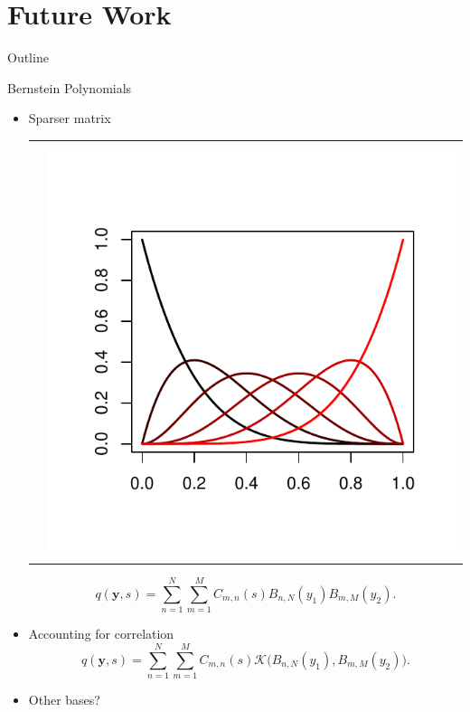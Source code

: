 \documentclass{beamer}
\newcommand{\by} {\mathbf{y}}
\begin{document}
\section{Future Work}

\begin{frame}{Outline}
  \tableofcontents[currentsection]
\end{frame}




\begin{frame}{Bernstein Polynomials}
\begin{itemize}
	\item Sparser matrix
	\vspace{-10mm}
	\begin{centering}
	\begin{tabular}{cc}
		\begin{minipage}{0.5\textwidth}
		\[ B_{\nu,n}(x) = \left( \begin{array}{c} n \\ \nu \end{array} \right) x^\nu (1-x)^{n-\nu},\]
		\[\nu = 0, \ldots, n \]
		\end{minipage}
		&
		\begin{minipage}{0.5\textwidth}
			\includegraphics[scale=.5]{./section-4-figures/bernstein.pdf}
		\end{minipage}
	\end{tabular}
	\end{centering}
	\vspace{-10mm}
	\[ q(\by, s) = \sum_{n=1}^N \sum_{m=1}^M C_{m,n}(s) B_{n,N}(y_1) B_{m,M}(y_2). \]

	\item Accounting for correlation 
		\[ q(\by, s) = \sum_{n=1}^N \sum_{m=1}^M C_{m,n}(s) \mathcal{K}\bigg(B_{n,N}(y_1) , B_{m,M}(y_2) \bigg). \]

	\item Other bases?
\end{itemize}

\end{frame}
\end{document}
